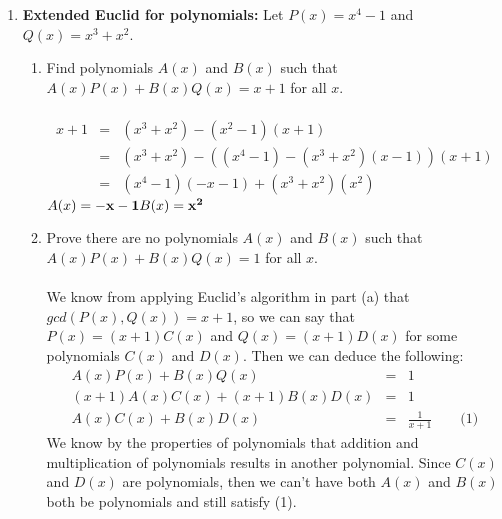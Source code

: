 \documentclass[11pt,fleqn]{article}
\begin{document}
\begin{enumerate}
\newpage
\item  \textbf{Extended Euclid for polynomials:}
Let $P(x) = x^4 - 1$ and $Q(x) = x^3 + x^2$.
\begin{enumerate}
\item Find polynomials $A(x)$ and $B(x)$ such that $A(x) P(x) + B(x) Q(x) = x + 1$ for all $x$. \\\\
\begin{eqnarray*}
x+1 &=& (x^3 + x^2) - (x^2 - 1)(x+1) \\
    &=& (x^3 + x^2) - ((x^4 - 1)-(x^3 + x^2)(x-1))(x+1) \\
    &=& (x^4 - 1)(-x-1) + (x^3 + x^2)(x^2)
\end{eqnarray*}
$A(x) = {\bf -x-1} \\ B(x) = {\bf x^2}$
\item Prove there are no polynomials $A(x)$ and $B(x)$ such that $A(x) P(x) + B(x) Q(x) = 1$ for all $x$. \\\\
We know from applying Euclid's algorithm in part (a) that $gcd(P(x),Q(x)) = x+1$, so we can say that $P(x) = (x+1)C(x)$ and $Q(x) = (x+1)D(x)$ for some polynomials $C(x)$ and $D(x)$. Then we can deduce the following:
\begin{eqnarray*}
A(x) P(x) + B(x) Q(x) &=& 1 \\
(x+1)A(x)C(x) + (x+1)B(x)D(x) &=& 1 \\
A(x)C(x) + B(x)D(x) &=& \frac 1{x+1} \qquad \text{(1)}
\end{eqnarray*}
We know by the properties of polynomials that addition and multiplication of polynomials results in another polynomial. Since $C(x)$ and $D(x)$ are polynomials, then we can't have both $A(x)$ and $B(x)$ both be polynomials and still satisfy (1).
\end{enumerate}


\end{enumerate}
\end{document}
